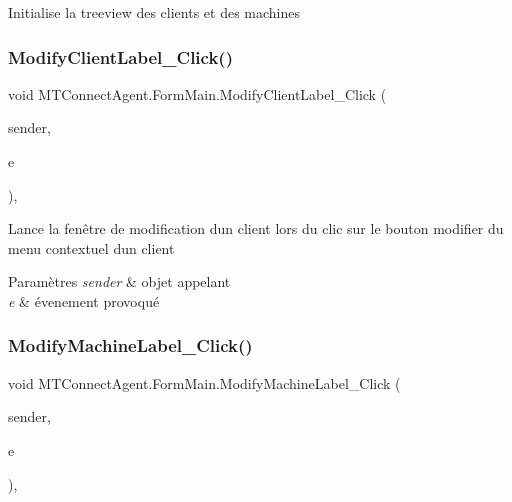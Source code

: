 Initialise la treeview des clients et des machines 

\mbox{\label{class_m_t_connect_agent_1_1_form_main_adf54b84f7d625d8656f6e6114c8da775}} 
\subsubsection{\texorpdfstring{Modify\+Client\+Label\+\_\+\+Click()}{ModifyClientLabel\_Click()}}
{\footnotesize\ttfamily void M\+T\+Connect\+Agent.\+Form\+Main.\+Modify\+Client\+Label\+\_\+\+Click (\begin{DoxyParamCaption}\item[{object}]{sender,  }\item[{Event\+Args}]{e }\end{DoxyParamCaption})\hspace{0.3cm}{\ttfamily [inline]}, {\ttfamily [private]}}



Lance la fenêtre de modification d\textquotesingle{}un client lors du clic sur le bouton modifier du menu contextuel d\textquotesingle{}un client 


\begin{DoxyParams}{Paramètres}
{\em sender} & objet appelant\\
\hline
{\em e} & évenement provoqué\\
\hline
\end{DoxyParams}
\mbox{\label{class_m_t_connect_agent_1_1_form_main_ab8577129e9dfbf78979a80aaf5e7bf6a}} 
\subsubsection{\texorpdfstring{Modify\+Machine\+Label\+\_\+\+Click()}{ModifyMachineLabel\_Click()}}
{\footnotesize\ttfamily void M\+T\+Connect\+Agent.\+Form\+Main.\+Modify\+Machine\+Label\+\_\+\+Click (\begin{DoxyParamCaption}\item[{object}]{sender,  }\item[{Event\+Args}]{e }\end{DoxyParamCaption})\hspace{0.3cm}{\ttfamily [inline]}, {\ttfamily [private]}}



